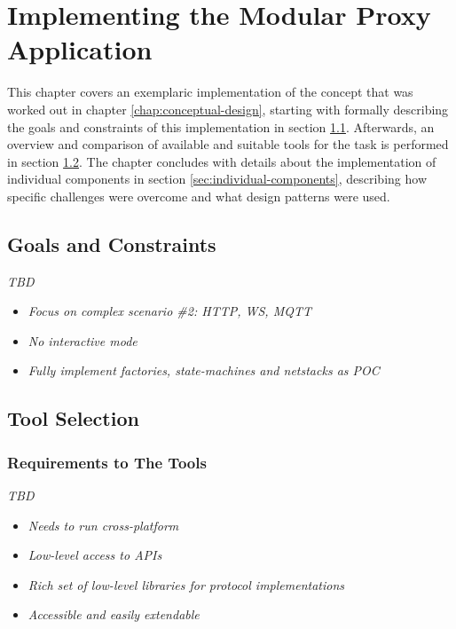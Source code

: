 \chapter{Implementing the Modular Proxy Application}
\label{chap:implementation}
This chapter covers an exemplaric implementation of the concept that was worked out in chapter \ref{chap:conceptual-design}, starting with formally describing the goals and constraints of this implementation in section \ref{sec:goals-constraints}. Afterwards, an overview and comparison of available and suitable tools for the task is performed in section \ref{sec:tool-selection}. The chapter concludes with details about the implementation of individual components in section \ref{sec:individual-components}, describing how specific challenges were overcome and what design patterns were used.

\section{Goals and Constraints}
\label{sec:goals-constraints}
\emph{TBD} %
\begin{itemize}
    \item \emph{Focus on complex scenario \#2: HTTP, WS, MQTT}
    \item \emph{No interactive mode}
    \item \emph{Fully implement factories, state-machines and netstacks as POC}
\end{itemize}

\section{Tool Selection}
\label{sec:tool-selection}

\subsection{Requirements to The Tools}
\emph{TBD} %
\begin{itemize}
    \item \emph{Needs to run cross-platform}
    \item \emph{Low-level access to APIs}
    \item \emph{Rich set of low-level libraries for protocol implementations}
    \item \emph{Accessible and easily extendable}
\end{itemize}


